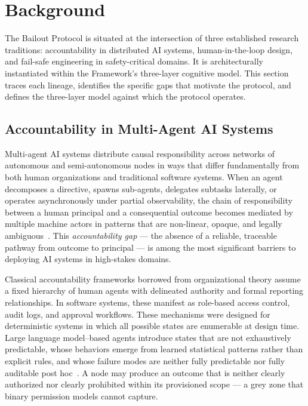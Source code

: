 \section{Background}
\label{sec:background}

The Bailout Protocol is situated at the intersection of three established research traditions: accountability in distributed AI systems, human-in-the-loop design, and fail-safe engineering in safety-critical domains. It is architecturally instantiated within the \bxthree{} Framework's three-layer cognitive model. This section traces each lineage, identifies the specific gaps that motivate the protocol, and defines the three-layer model against which the protocol operates.

\subsection{Accountability in Multi-Agent AI Systems}
\label{sec:accountability}

Multi-agent AI systems distribute causal responsibility across networks of autonomous and semi-autonomous nodes in ways that differ fundamentally from both human organizations and traditional software systems. When an agent decomposes a directive, spawns sub-agents, delegates subtasks laterally, or operates asynchronously under partial observability, the chain of responsibility between a human principal and a consequential outcome becomes mediated by multiple machine actors in patterns that are non-linear, opaque, and legally ambiguous~\cite{bansal2019}. This \emph{accountability gap} — the absence of a reliable, traceable pathway from outcome to principal — is among the most significant barriers to deploying AI systems in high-stakes domains.

Classical accountability frameworks borrowed from organizational theory assume a fixed hierarchy of human agents with delineated authority and formal reporting relationships. In software systems, these manifest as role-based access control, audit logs, and approval workflows. These mechanisms were designed for deterministic systems in which all possible states are enumerable at design time. Large language model--based agents introduce states that are not exhaustively predictable, whose behaviors emerge from learned statistical patterns rather than explicit rules, and whose failure modes are neither fully predictable nor fully auditable post hoc~\cite{dijkstra1982}. A node may produce an outcome that is neither clearly authorized nor clearly prohibited within its provisioned scope — a grey zone that binary permission models cannot capture.


